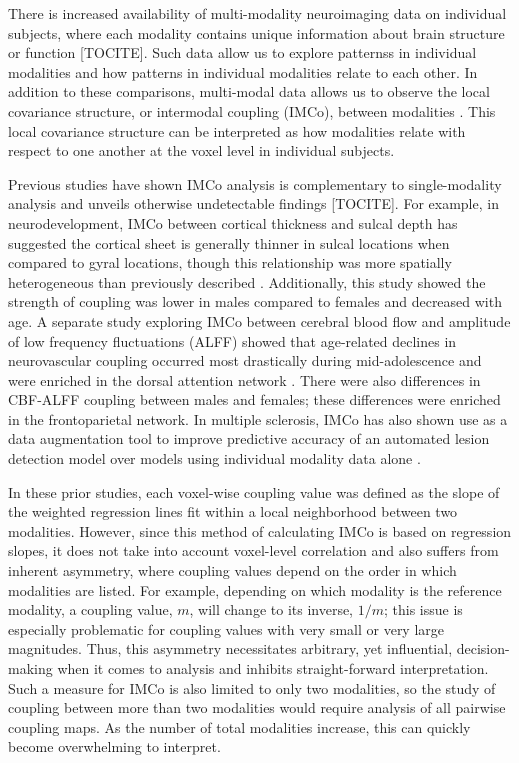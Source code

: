 \documentclass[
  12pt,
]{article}
\begin{document}
There is increased availability of multi-modality neuroimaging data on individual subjects, where each modality contains unique information about brain structure or function {[}TOCITE{]}. Such data allow us to explore patternss in individual modalities and how patterns in individual modalities relate to each other. In addition to these comparisons, multi-modal data allows us to observe the local covariance structure, or intermodal coupling (IMCo), between modalities \citep{ballerDevelopmentalCouplingCerebral2021, valcarcelMIMoSAAutomatedMethod2018, vandekarSubjectlevelMeasurementLocal2016}. This local covariance structure can be interpreted as how modalities relate with respect to one another at the voxel level in individual subjects.

Previous studies have shown IMCo analysis is complementary to single-modality analysis and unveils otherwise undetectable findings {[}TOCITE{]}. For example, in neurodevelopment, IMCo between cortical thickness and sulcal depth has suggested the cortical sheet is generally thinner in sulcal locations when compared to gyral locations, though this relationship was more spatially heterogeneous than previously described \citep{vandekarSubjectlevelMeasurementLocal2016}. Additionally, this study showed the strength of coupling was lower in males compared to females and decreased with age. A separate study exploring IMCo between cerebral blood flow and amplitude of low frequency fluctuations (ALFF) showed that age-related declines in neurovascular coupling occurred most drastically during mid-adolescence and were enriched in the dorsal attention network \citep{ballerDevelopmentalCouplingCerebral2021}. There were also differences in CBF-ALFF coupling between males and females; these differences were enriched in the frontoparietal network. In multiple sclerosis, IMCo has also shown use as a data augmentation tool to improve predictive accuracy of an automated lesion detection model over models using individual modality data alone \citep{valcarcelDualModelingApproach2018, valcarcelMIMoSAAutomatedMethod2018}.

In these prior studies, each voxel-wise coupling value was defined as the slope of the weighted regression lines fit within a local neighborhood between two modalities. However, since this method of calculating IMCo is based on regression slopes, it does not take into account voxel-level correlation and also suffers from inherent asymmetry, where coupling values depend on the order in which modalities are listed. For example, depending on which modality is the reference modality, a coupling value, \(m\), will change to its inverse, \(1 / m\); this issue is especially problematic for coupling values with very small or very large magnitudes. Thus, this asymmetry necessitates arbitrary, yet influential, decision-making when it comes to analysis and inhibits straight-forward interpretation. Such a measure for IMCo is also limited to only two modalities, so the study of coupling between more than two modalities would require analysis of all pairwise coupling maps. As the number of total modalities increase, this can quickly become overwhelming to interpret.
\end{document}

